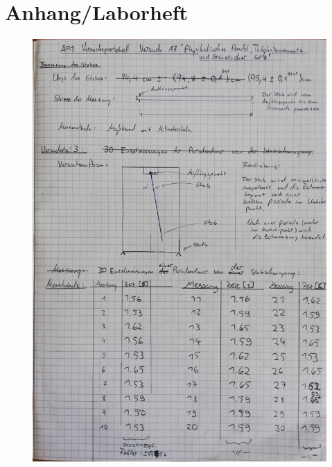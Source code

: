 \documentclass[11pt,a4paper]{article}
\begin{document}
\newpage
\section{Anhang/Laborheft}
\begin{figure}[H]
	\includegraphics[width=1\linewidth]{S1.jpg}
	\centering
\end{figure}
\end{document}
